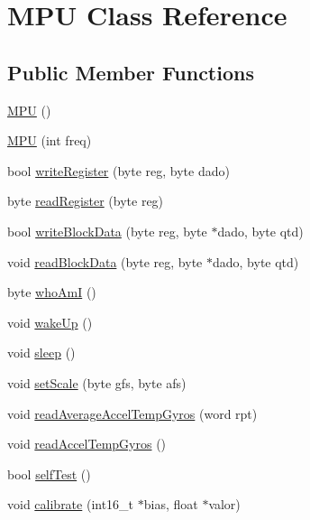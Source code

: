 \hypertarget{class_m_p_u}{}\section{M\+PU Class Reference}
\label{class_m_p_u}
\subsection*{Public Member Functions}
\begin{DoxyCompactItemize}
\item 
\hyperlink{class_m_p_u_a0deec2f8e8170b2e21ee015940d550b6}{M\+PU} ()
\item 
\hyperlink{class_m_p_u_a524c777097cbc9ae0c3942d1d115787c}{M\+PU} (int freq)
\item 
bool \hyperlink{class_m_p_u_a048d708b54073a32c0daa6b1b8e4a365}{write\+Register} (byte reg, byte dado)
\item 
byte \hyperlink{class_m_p_u_aa42e2711c058fa9abe5af418ae4cf647}{read\+Register} (byte reg)
\item 
bool \hyperlink{class_m_p_u_a691201f2735fc1d9270166e0cb190e79}{write\+Block\+Data} (byte reg, byte $\ast$dado, byte qtd)
\item 
void \hyperlink{class_m_p_u_abbb1b779a2a248020210dddf074c077a}{read\+Block\+Data} (byte reg, byte $\ast$dado, byte qtd)
\item 
byte \hyperlink{class_m_p_u_a37db9ff5d63c1bccd5a9a5d08ae58fe7}{who\+AmI} ()
\item 
void \hyperlink{class_m_p_u_a1ccf05ed209b8305bf6a74a7daffb880}{wake\+Up} ()
\item 
void \hyperlink{class_m_p_u_a93abaf43da55d96c26ef4212afc671f9}{sleep} ()
\item 
void \hyperlink{class_m_p_u_ac4cc325b1514c121892ed86f292dad99}{set\+Scale} (byte gfs, byte afs)
\item 
void \hyperlink{class_m_p_u_a0240f4cd1c4ba1528ac86eccb9da261a}{read\+Average\+Accel\+Temp\+Gyros} (word rpt)
\item 
void \hyperlink{class_m_p_u_ad0d6f8dfbf2e0b86f4918deaa1e1e8ff}{read\+Accel\+Temp\+Gyros} ()
\item 
bool \hyperlink{class_m_p_u_a5559e8a86d055d7e6e9f19ff65851fae}{self\+Test} ()
\item 
void \hyperlink{class_m_p_u_a9978b29c17eee830126686e082799808}{calibrate} (int16\+\_\+t $\ast$bias, float $\ast$valor)
\end{DoxyCompactItemize}
